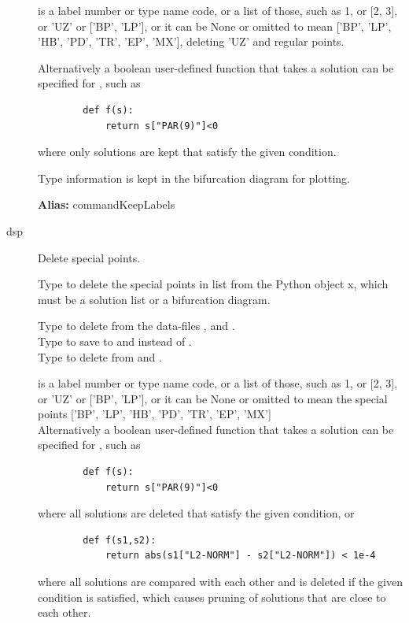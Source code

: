 \documentclass[12pt]{report}
\begin{document}
\begin{description}
     is a label number or type name code, or a list of those,
    such as 1, or [2, 3], or 'UZ' or ['BP', 'LP'], or it can be None or
    omitted to mean ['BP', 'LP', 'HB', 'PD', 'TR', 'EP', 'MX'], deleting 'UZ' and
    regular points.

    Alternatively a boolean user-defined function  that
    takes a solution can be specified for , such as
\begin{verbatim}
        def f(s):
            return s["PAR(9)"]<0
\end{verbatim}
    where only solutions are kept that satisfy the given condition.

    Type information is kept in the bifurcation diagram for plotting.

\textbf{Alias:} commandKeepLabels

\item[dsp]
Delete special points.

    Type  to delete the special points in list from
    the Python object x, which must be a solution list or a bifurcation diagram.

    Type  to delete from the data-files
    , and .\\
    Type  to save to  and
     instead of .\\
    Type  to delete from  and .

     is a label number or type name code, or a list of those,
    such as 1, or [2, 3], or 'UZ' or ['BP', 'LP'], or it can be None or
    omitted to mean the special points ['BP', 'LP', 'HB', 'PD', 'TR', 'EP',
    'MX']\\
    Alternatively a boolean user-defined function  that
    takes a solution can be specified for , such as
\begin{verbatim}
        def f(s):
            return s["PAR(9)"]<0
\end{verbatim}
    where all solutions are deleted that satisfy the given condition, or
\begin{verbatim}
        def f(s1,s2):
            return abs(s1["L2-NORM"] - s2["L2-NORM"]) < 1e-4
\end{verbatim}
    where all solutions are compared with each other and 
    is deleted if the given condition is satisfied, which causes
    pruning of solutions that are close to each other.


\end{description}
\end{document}
